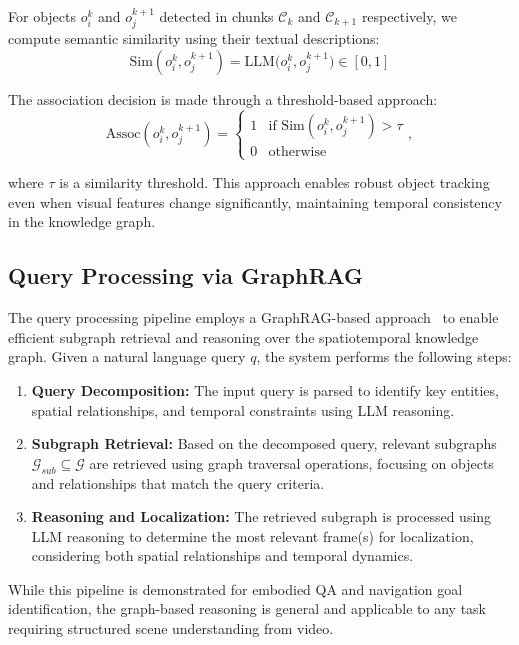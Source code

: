 For objects $o_i^k$ and $o_j^{k+1}$ detected in chunks $\mathcal{C}_k$ and $\mathcal{C}_{k+1}$ respectively, we compute semantic similarity using their textual descriptions:
\begin{equation}
\text{Sim}(o_i^k, o_j^{k+1}) = \text{LLM}\big(o_i^k, o_j^{k+1}\big) \in [0, 1]
\end{equation}

The association decision is made through a threshold-based approach:
\begin{equation}
\text{Assoc}(o_i^k, o_j^{k+1}) = \begin{cases}
1 & \text{if } \text{Sim}(o_i^k, o_j^{k+1}) > \tau \\
0 & \text{otherwise}
\end{cases},
\end{equation}

where $\tau$ is a similarity threshold.
This approach enables robust object tracking even when visual features change significantly, maintaining temporal consistency in the knowledge graph.

\subsection{Query Processing via GraphRAG}

The query processing pipeline employs a GraphRAG-based approach~\cite{Han2024RetrievalAugmentedGW} to enable efficient subgraph retrieval and reasoning over the spatiotemporal knowledge graph.
Given a natural language query $q$, the system performs the following steps:
\begin{enumerate}
    \item \textbf{Query Decomposition:} The input query is parsed to identify key entities, spatial relationships, and temporal constraints using LLM reasoning.
    \item \textbf{Subgraph Retrieval:} Based on the decomposed query, relevant subgraphs $\mathcal{G}_{sub} \subseteq \mathcal{G}$ are retrieved using graph traversal operations, focusing on objects and relationships that match the query criteria.
    \item \textbf{Reasoning and Localization:} The retrieved subgraph is processed using LLM reasoning to determine the most relevant frame(s) for localization, considering both spatial relationships and temporal dynamics.
\end{enumerate}
While this pipeline is demonstrated for embodied QA and navigation goal identification, the graph-based reasoning is general and applicable to any task requiring structured scene understanding from video.


